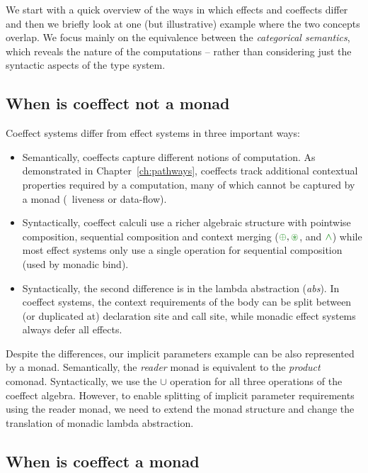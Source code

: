 We start with a quick overview of the ways in which effects and coeffects differ and then
we briefly look at one (but illustrative) example where the two concepts overlap. We focus 
mainly on the equivalence between the \emph{categorical semantics}, which reveals the nature
of the computations -- rather than considering just the syntactic aspects of the type system.

\subsection{When is coeffect not a monad}
Coeffect systems differ from effect systems in three important ways:

\begin{itemize}
\item Semantically, coeffects capture different notions of computation. As demonstrated in 
  Chapter~\ref{ch:pathways}, coeffects track additional contextual properties required by a
  computation, many of which cannot be captured by a monad (\eg~liveness or data-flow).

\item Syntactically, coeffect calculi use a richer algebraic structure with pointwise composition,
  sequential composition and context merging ($\cpar, \cseq$, and $\czip$) while most effect systems
  only use a single operation for sequential composition (used by monadic bind).

\item Syntactically, the second difference is in the lambda abstraction (\emph{abs}). In 
  coeffect systems, the context requirements of the body can be split between (or duplicated
  at) declaration site and call site, while monadic effect systems always defer all effects.
\end{itemize}

\noindent
Despite the differences, our implicit parameters example can be also represented by a monad.
Semantically, the \emph{reader} monad is equivalent to the \emph{product} comonad. Syntactically,
we use the $\cup$ operation for all three operations of the coeffect algebra. However, to enable
splitting of implicit parameter requirements using the reader monad, we need to extend the 
monad structure and change the translation of monadic lambda abstraction.


\subsection{When is coeffect a monad}
\label{sec:flat-related-monads}

